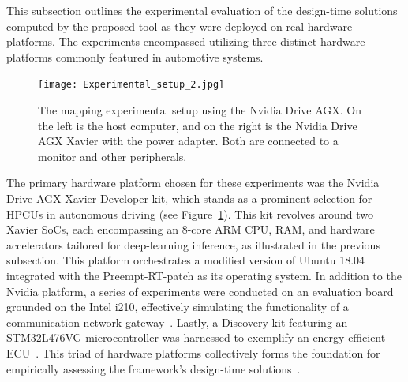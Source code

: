     
    
    This subsection outlines the experimental evaluation of the design-time solutions computed by the proposed tool as they were deployed on real hardware platforms. The experiments encompassed utilizing three distinct hardware platforms commonly featured in automotive systems.
    
    \begin{figure}[t]
    \centering
    \texttt{[image: Experimental\_setup\_2.jpg]}
    \caption{The mapping experimental setup using the Nvidia Drive AGX. On the left is the host computer, and on the right is the Nvidia Drive AGX Xavier with the power adapter. Both are connected to a monitor and other peripherals.}
    \label{fig76}
    \end{figure}

    The primary hardware platform chosen for these experiments was the Nvidia Drive AGX Xavier Developer kit, which stands as a prominent selection for HPCUs in autonomous driving (see Figure~\ref{fig76}). This kit revolves around two Xavier SoCs, each encompassing an 8-core ARM CPU, RAM, and hardware accelerators tailored for deep-learning inference, as illustrated in the previous subsection. This platform orchestrates a modified version of Ubuntu 18.04 integrated with the Preempt-RT-patch as its operating system.
    In addition to the Nvidia platform, a series of experiments were conducted on an evaluation board grounded on the Intel i210, effectively simulating the functionality of a communication network gateway~\cite{Intel}. Lastly, a Discovery kit featuring an STM32L476VG microcontroller was harnessed to exemplify an energy-efficient ECU~\cite{STM}.
    This triad of hardware platforms collectively forms the foundation for empirically assessing the framework's design-time solutions~\cite{askaripoor2023designer}.
    
